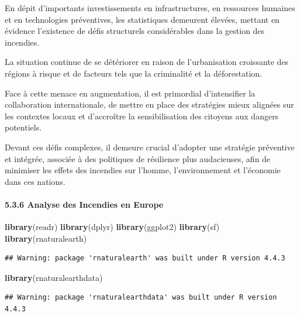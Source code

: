 \documentclass[
]{article}
\newenvironment{Shaded}{\begin{snugshade}}{\end{snugshade}}
\newcommand{\FunctionTok}[1]{\textcolor[rgb]{0.13,0.29,0.53}{\textbf{#1}}}
\newcommand{\NormalTok}[1]{#1}
\begin{document}
En dépit d'importants investissements en infrastructures, en ressources
humaines et en technologies préventives, les statistiques demeurent
élevées, mettant en évidence l'existence de défis structurels
considérables dans la gestion des incendies.

La situation continue de se détériorer en raison de l'urbanisation
croissante des régions à risque et de facteurs tels que la criminalité
et la déforestation.

Face à cette menace en augmentation, il est primordial d'intensifier la
collaboration internationale, de mettre en place des stratégies mieux
alignées sur les contextes locaux et d'accroître la sensibilisation des
citoyens aux dangers potentiels.

Devant ces défis complexes, il demeure crucial d'adopter une stratégie
préventive et intégrée, associée à des politiques de résilience plus
audacieuses, afin de minimiser les effets des incendies sur l'homme,
l'environnement et l'économie dans ces nations.

\paragraph{5.3.6 Analyse des Incendies en
Europe}\label{analyse-des-incendies-en-europe}

\begin{Shaded}
\begin{Highlighting}[]
\FunctionTok{library}\NormalTok{(readr)}
\FunctionTok{library}\NormalTok{(dplyr)}
\FunctionTok{library}\NormalTok{(ggplot2)}
\FunctionTok{library}\NormalTok{(sf)}
\FunctionTok{library}\NormalTok{(rnaturalearth)}
\end{Highlighting}
\end{Shaded}

\begin{verbatim}
## Warning: package 'rnaturalearth' was built under R version 4.4.3
\end{verbatim}

\begin{Shaded}
\begin{Highlighting}[]
\FunctionTok{library}\NormalTok{(rnaturalearthdata)}
\end{Highlighting}
\end{Shaded}

\begin{verbatim}
## Warning: package 'rnaturalearthdata' was built under R version 4.4.3
\end{verbatim}
\end{document}
